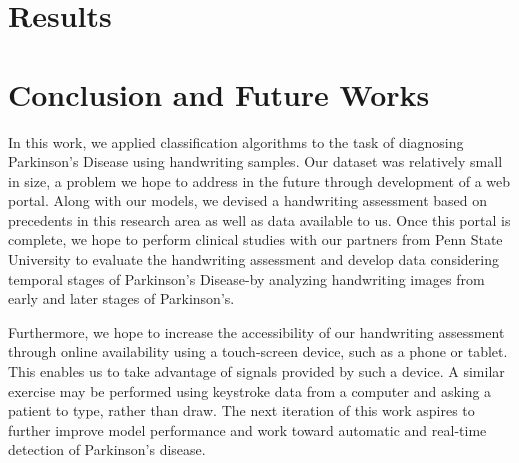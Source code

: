 \documentclass[pmlr,twocolumn,10pt]{jmlr} %
\begin{document}
\section{Results}
\label{Results}

\section{Conclusion and Future Works}
\label{Conclusion+FutureWorks} In this work, we applied classification algorithms to the task of diagnosing Parkinson's Disease using handwriting samples. Our dataset was relatively small in size, a problem we hope to address in the future through development of a web portal. Along with our models, we devised a handwriting assessment based on precedents in this research area as well as data available to us. Once this portal is complete, we hope to perform clinical studies with our partners from Penn State University to evaluate the handwriting assessment and develop data considering temporal stages of Parkinson’s Disease-by analyzing handwriting images from early and later stages of Parkinson’s. 

Furthermore, we hope to increase the accessibility of our handwriting assessment through online availability using a touch-screen device, such as a phone or tablet. This enables us to take advantage of signals provided by such a device. A similar exercise may be performed using keystroke data from a computer and asking a patient to type, rather than draw. The next iteration of this work aspires to further improve model performance and work toward automatic and real-time detection of Parkinson’s disease.

\clearpage


\nocite{*}

\clearpage
\end{document}

